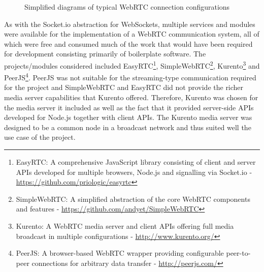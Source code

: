       \begin{figure}[h!]
      \centering
      \caption[Simplified diagrams of typical WebRTC connection configurations]{Simplified diagrams of typical WebRTC connection configurations}
      \label{fig:softDesign-webRTCBroadcastExamples}
      \end{figure}
      
      As with the Socket.io abstraction for WebSockets, multiple services and modules were available for the implementation of a WebRTC communication system, all of which were free and consumed much of the work that would have been required for development consisting primarily of boilerplate software. The projects/modules considered included EasyRTC\footnote{EasyRTC: A comprehensive JavaScript library consisting of client and server APIs developed for multiple browsers, Node.js and signalling via Socket.io - \url{https://github.com/priologic/easyrtc}}, SimpleWebRTC\footnote{SimpleWebRTC: A simplified abstraction of the core WebRTC components and features - \url{https://github.com/andyet/SimpleWebRTC}}, Kurento\footnote{Kurento: A WebRTC media server and client APIs offering full media broadcast in multiple configurations - \url{http://www.kurento.org/}} and PeerJS\footnote{PeerJS: A browser-based WebRTC wrapper providing configurable peer-to-peer connections for arbitrary data transfer - \url{http://peerjs.com/}}. PeerJS was not suitable for the streaming-type communication required for the project and SimpleWebRTC and EasyRTC did not provide the richer media server capabilities that Kurento offered. Therefore, Kurento was chosen for the media server it included as well as the fact that it provided server-side APIs developed for Node.js together with client APIs. The Kurento media server was designed to be a common node in a broadcast network and thus suited well the use case of the project.
      
